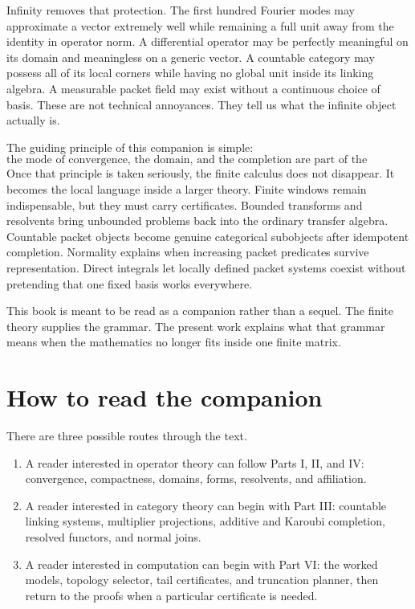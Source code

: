 \documentclass[11pt]{article}
\theoremstyle{definition}
\theoremstyle{remark}
\begin{document}
Infinity removes that protection.  The first hundred Fourier modes may approximate a vector extremely well while remaining a full unit away from the identity in operator norm.  A differential operator may be perfectly meaningful on its domain and meaningless on a generic vector.  A countable category may possess all of its local corners while having no global unit inside its linking algebra.  A measurable packet field may exist without a continuous choice of basis.  These are not technical annoyances.  They tell us what the infinite object actually is.

The guiding principle of this companion is simple:
\[
\boxed{\text{the mode of convergence, the domain, and the completion are part of the resolution data.}}
\]
Once that principle is taken seriously, the finite calculus does not disappear.  It becomes the local language inside a larger theory.  Finite windows remain indispensable, but they must carry certificates.  Bounded transforms and resolvents bring unbounded problems back into the ordinary transfer algebra.  Countable packet objects become genuine categorical subobjects after idempotent completion.  Normality explains when increasing packet predicates survive representation.  Direct integrals let locally defined packet systems coexist without pretending that one fixed basis works everywhere.

This book is meant to be read as a companion rather than a sequel.  The finite theory supplies the grammar.  The present work explains what that grammar means when the mathematics no longer fits inside one finite matrix.

\section*{How to read the companion}
There are three possible routes through the text.

\begin{enumerate}[label=\arabic*.]
\item A reader interested in operator theory can follow Parts I, II, and IV: convergence, compactness, domains, forms, resolvents, and affiliation.
\item A reader interested in category theory can begin with Part III: countable linking systems, multiplier projections, additive and Karoubi completion, resolved functors, and normal joins.
\item A reader interested in computation can begin with Part VI: the worked models, topology selector, tail certificates, and truncation planner, then return to the proofs when a particular certificate is needed.
\end{enumerate}
\end{document}
